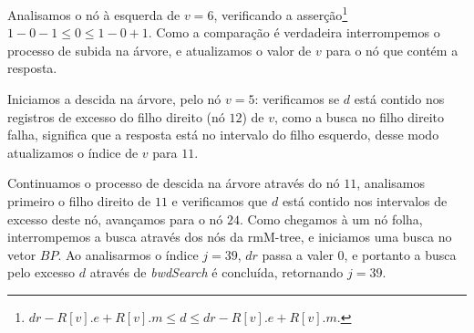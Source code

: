 \begin{example}
        Analisamos o nó à esquerda de $v=6$, verificando a asserção\footnote{$dr - R[v].e + R[v].m \leq d \leq dr - R[v].e + R[v].m$.} $ 1 -0 -1 \leq 0 \leq 1 -0 +1$. Como a comparação é verdadeira interrompemos o processo de subida na árvore, e atualizamos o valor de $v$ para o nó que contém a resposta.
        
        Iniciamos a descida na árvore, pelo nó $v=5$: verificamos se $d$ está contido nos registros de excesso do filho direito (nó $12$) de $v$, como a busca no filho direito falha, significa que a resposta está no intervalo do filho esquerdo, desse modo atualizamos o índice de $v$ para $11$.

        Continuamos o processo de descida na árvore através do nó $11$, analisamos primeiro o filho direito de $11$ e verificamos que $d$ está contido nos intervalos de excesso deste nó, avançamos para o nó $24$. Como chegamos à um nó folha, interrompemos a busca através dos nós da rmM-tree, e iniciamos uma busca no vetor $BP$. Ao analisarmos o índice $j=39$, $dr$ passa a valer $0$, e portanto a busca pelo excesso $d$ através de \textit{bwdSearch} é concluída, retornando $j=39$. 
    \end{example}

